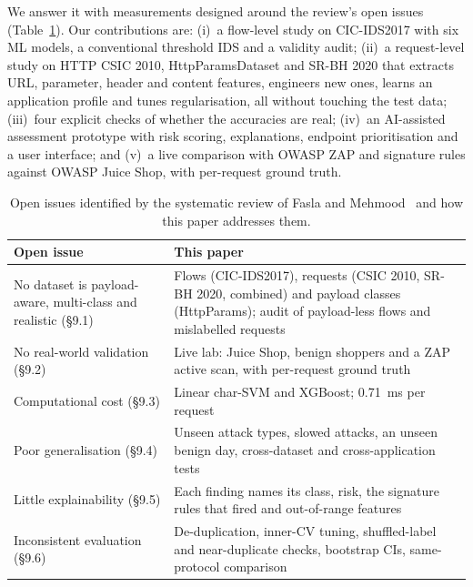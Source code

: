 \documentclass[conference]{IEEEtran}
\begin{document}
We answer it with measurements designed around the review's open issues (Table~\ref{tab:gaps}).
Our contributions are:
(i)~a flow-level study on CIC-IDS2017 with six ML models, a conventional threshold IDS and a
validity audit;
(ii)~a request-level study on HTTP CSIC 2010, HttpParamsDataset and SR-BH 2020 that extracts
URL, parameter, header and content features, engineers new ones, learns an application profile
and tunes regularisation, all without touching the test data;
(iii)~four explicit checks of whether the accuracies are real;
(iv)~an AI-assisted assessment prototype with risk scoring, explanations, endpoint prioritisation
and a user interface; and
(v)~a live comparison with OWASP ZAP and signature rules against OWASP Juice Shop, with
per-request ground truth.

\begin{table}[t]
\centering
\caption{Open issues identified by the systematic review of Fasla and Mehmood~\cite{fasla2026}
and how this paper addresses them.}
\label{tab:gaps}
\setlength{\tabcolsep}{3pt}\renewcommand{\arraystretch}{1.1}
\footnotesize
\begin{tabular}{@{}p{}p{}@{}}
\toprule
Open issue~\cite{fasla2026} & This paper \\
\midrule
No dataset is payload-aware, multi-class and realistic (\S9.1) &
Flows (CIC-IDS2017), requests (CSIC 2010, SR-BH 2020, combined) and payload classes
(HttpParams); audit of payload-less flows and mislabelled requests \\
No real-world validation (\S9.2) &
Live lab: Juice Shop, benign shoppers and a ZAP active scan, with per-request ground truth \\
Computational cost (\S9.3) &
Linear char-SVM and XGBoost; 0.71~ms per request \\
Poor generalisation (\S9.4) &
Unseen attack types, slowed attacks, an unseen benign day, cross-dataset and cross-application tests \\
Little explainability (\S9.5) &
Each finding names its class, risk, the signature rules that fired and out-of-range features \\
Inconsistent evaluation (\S9.6) &
De-duplication, inner-CV tuning, shuffled-label and near-duplicate checks, bootstrap CIs,
same-protocol comparison \\
\bottomrule
\end{tabular}
\end{table}

\end{document}
